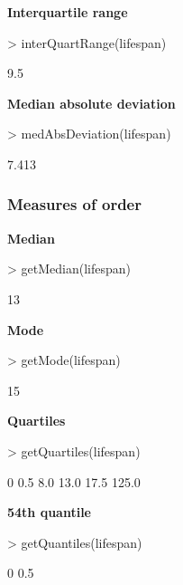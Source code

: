 \documentclass[a4paper]{article}
\begin{document}

\textbf{Interquartile range}
\begin{Schunk}
\begin{Sinput}
> interQuartRange(lifespan)
\end{Sinput}
\begin{Soutput}
[1] 9.5
\end{Soutput}
\end{Schunk}


\textbf{Median absolute deviation}
\begin{Schunk}
\begin{Sinput}
> medAbsDeviation(lifespan)
\end{Sinput}
\begin{Soutput}
[1] 7.413
\end{Soutput}
\end{Schunk}



\subsubsection*{Measures of order}


\textbf{Median}
\begin{Schunk}
\begin{Sinput}
> getMedian(lifespan)
\end{Sinput}
\begin{Soutput}
[1] 13
\end{Soutput}
\end{Schunk}


\textbf{Mode}

\begin{Schunk}
\begin{Sinput}
> getMode(lifespan)
\end{Sinput}
\begin{Soutput}
[1] 15
\end{Soutput}
\end{Schunk}


\textbf{Quartiles}
\begin{Schunk}
\begin{Sinput}
> getQuartiles(lifespan)
\end{Sinput}
\begin{Soutput}
   0%   25%   50%   75%  100% 
  0.5   8.0  13.0  17.5 125.0 
\end{Soutput}
\end{Schunk}


\textbf{54th quantile}

\begin{Schunk}
\begin{Sinput}
> getQuantiles(lifespan)
\end{Sinput}
\begin{Soutput}
 0% 
0.5 
\end{Soutput}
\end{Schunk}
\end{document}
